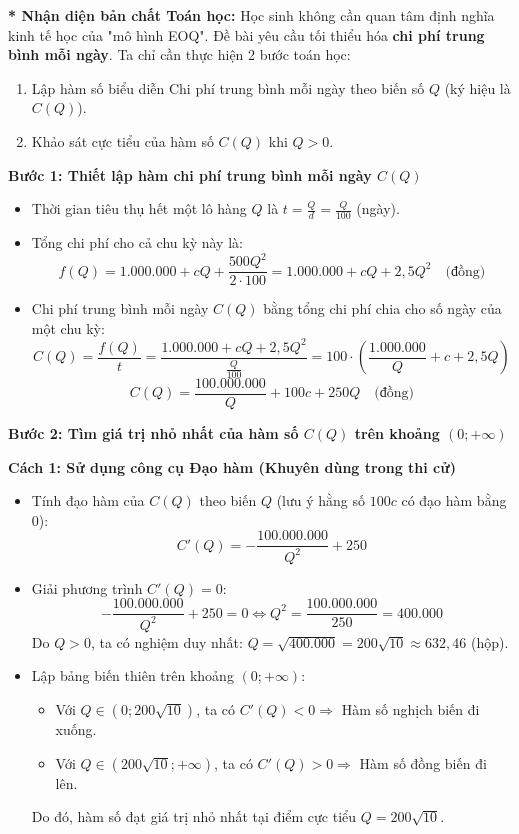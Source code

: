 \documentclass[12pt]{article}
\begin{document}
	\begin{loigiai}
		\textbf{* Nhận diện bản chất Toán học:} 
		Học sinh không cần quan tâm định nghĩa kinh tế học của "mô hình EOQ". Đề bài yêu cầu tối thiểu hóa \textbf{chi phí trung bình mỗi ngày}. Ta chỉ cần thực hiện 2 bước toán học:
		\begin{enumerate}
			\item Lập hàm số biểu diễn Chi phí trung bình mỗi ngày theo biến số $Q$ (ký hiệu là $C(Q)$).
			\item Khảo sát cực tiểu của hàm số $C(Q)$ khi $Q > 0$.
		\end{enumerate}
		
		\vspace{2mm}
		\textbf{Bước 1: Thiết lập hàm chi phí trung bình mỗi ngày $C(Q)$}
		\begin{itemize}
			\item Thời gian tiêu thụ hết một lô hàng $Q$ là $t = \frac{Q}{d} = \frac{Q}{100}$ (ngày).
			\item Tổng chi phí cho cả chu kỳ này là: 
			\[ f(Q) = 1.000.000 + cQ + \frac{500Q^2}{2 \cdot 100} = 1.000.000 + cQ + 2,5Q^2 \quad \text{(đồng)} \]
			\item Chi phí trung bình mỗi ngày $C(Q)$ bằng tổng chi phí chia cho số ngày của một chu kỳ:
			\[ C(Q) = \frac{f(Q)}{t} = \frac{1.000.000 + cQ + 2,5Q^2}{\frac{Q}{100}} = 100 \cdot \left( \frac{1.000.000}{Q} + c + 2,5Q \right) \]
			\[ C(Q) = \frac{100.000.000}{Q} + 100c + 250Q \quad \text{(đồng)} \]
		\end{itemize}
		
		\vspace{2mm}
		\textbf{Bước 2: Tìm giá trị nhỏ nhất của hàm số $C(Q)$ trên khoảng $(0; +\infty)$}
		
		\vspace{2mm}
		\textbf{Cách 1: Sử dụng công cụ Đạo hàm (Khuyên dùng trong thi cử)}
		\begin{itemize}
			\item Tính đạo hàm của $C(Q)$ theo biến $Q$ (lưu ý hằng số $100c$ có đạo hàm bằng 0):
			\[ C'(Q) = -\frac{100.000.000}{Q^2} + 250 \]
			\item Giải phương trình $C'(Q) = 0$:
			\[ -\frac{100.000.000}{Q^2} + 250 = 0 \Leftrightarrow Q^2 = \frac{100.000.000}{250} = 400.000 \]
			Do $Q > 0$, ta có nghiệm duy nhất: $Q = \sqrt{400.000} = 200\sqrt{10} \approx 632,46$ (hộp).
			\item Lập bảng biến thiên trên khoảng $(0; +\infty)$:
			\begin{itemize}
				\item Với $Q \in (0; 200\sqrt{10})$, ta có $C'(Q) < 0 \Rightarrow$ Hàm số nghịch biến đi xuống.
				\item Với $Q \in (200\sqrt{10}; +\infty)$, ta có $C'(Q) > 0 \Rightarrow$ Hàm số đồng biến đi lên.
			\end{itemize}
			Do đó, hàm số đạt giá trị nhỏ nhất tại điểm cực tiểu $Q = 200\sqrt{10}$.
		\end{itemize}
		

\end{loigiai}
\end{document}
